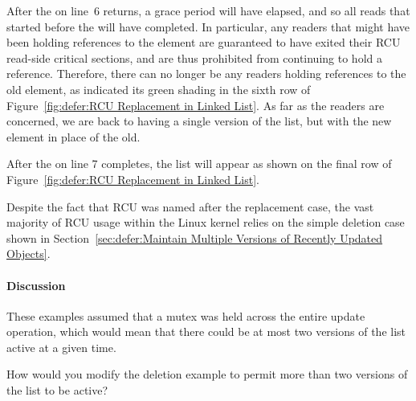 After the  on line~6 returns,
a grace period will have elapsed, and so all reads that started before the
 will have completed.
In particular, any readers that might have been holding references
to the  element are guaranteed to have exited
their RCU read-side critical sections, and are thus prohibited from
continuing to hold a reference.
Therefore, there can no longer be any readers holding references
to the old element, as indicated its green shading in the sixth row of
Figure~\ref{fig:defer:RCU Replacement in Linked List}.
As far as the readers are concerned, we are back to having a single version
of the list, but with the new element in place of the old.

After the  on line 7 completes, the list will
appear as shown on the final row of
Figure~\ref{fig:defer:RCU Replacement in Linked List}.

Despite the fact that RCU was named after the replacement case,
the vast majority of RCU usage within the Linux kernel relies on
the simple deletion case shown in
Section~\ref{sec:defer:Maintain Multiple Versions of Recently Updated Objects}.

\paragraph{Discussion}
\label{sec:defer:Discussion}

These examples assumed that a mutex was held across the entire
update operation, which would mean that there could be at most two
versions of the list active at a given time.

\QuickQuiz{}
	How would you modify the deletion example to permit more than two
	versions of the list to be active?
 \QuickQuizEnd

